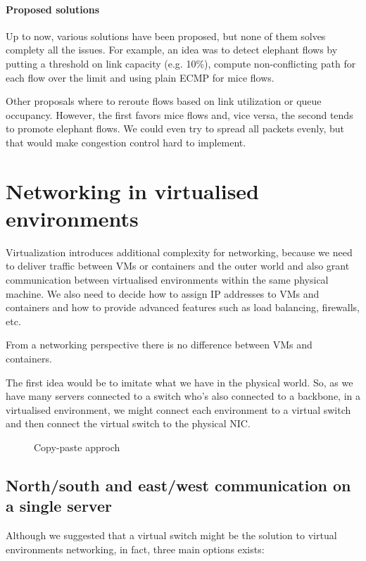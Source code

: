 \paragraph{Proposed solutions}
Up to now, various solutions have been proposed, but none of them solves complety
all the issues. For example, an idea was to detect elephant flows by putting
a threshold on link capacity (e.g. 10\%), compute non-conflicting path for
each flow over the limit and using plain ECMP for mice flows.

Other proposals where to reroute flows based on link utilization or queue
occupancy. However, the first favors mice flows and, vice versa, the second tends
to promote elephant flows. We could even try to spread all packets evenly, but
that would make congestion control hard to implement.

\section{Networking in virtualised environments}
Virtualization introduces additional complexity for networking, because we need
to deliver traffic between VMs or containers and the outer world and also grant
communication between virtualised environments within the same physical machine.
We also need to decide how to assign IP addresses to VMs and containers and
how to provide advanced features such as load balancing, firewalls, etc.

\begin{note}
    From a networking perspective there is no difference between VMs and
    containers.
\end{note}

\noindent
The first idea would be to imitate what we have in the physical world. So, as
we have many servers connected to a switch who's also connected to a backbone,
in a virtualised environment, we might connect each environment to a virtual
switch and then connect the virtual switch to the physical NIC.

\begin{figure}[h!]
    \centering
    \hspace{1.5cm}
    \caption{Copy-paste approch}
\end{figure}

\subsection{North/south and east/west communication on a single server}
Although we suggested that a virtual switch might be the solution to virtual
environments networking, in fact, three main options exists:

